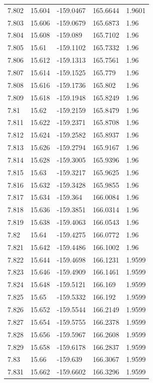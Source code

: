 \begin{tabular}{lllll}
7.802 & 15.604 & -159.0467 & 165.6644 & 1.9601 \\
7.803 & 15.606 & -159.0679 & 165.6873 & 1.96 \\
7.804 & 15.608 & -159.089 & 165.7102 & 1.96 \\
7.805 & 15.61 & -159.1102 & 165.7332 & 1.96 \\
7.806 & 15.612 & -159.1313 & 165.7561 & 1.96 \\
7.807 & 15.614 & -159.1525 & 165.779 & 1.96 \\
7.808 & 15.616 & -159.1736 & 165.802 & 1.96 \\
7.809 & 15.618 & -159.1948 & 165.8249 & 1.96 \\
7.81 & 15.62 & -159.2159 & 165.8479 & 1.96 \\
7.811 & 15.622 & -159.2371 & 165.8708 & 1.96 \\
7.812 & 15.624 & -159.2582 & 165.8937 & 1.96 \\
7.813 & 15.626 & -159.2794 & 165.9167 & 1.96 \\
7.814 & 15.628 & -159.3005 & 165.9396 & 1.96 \\
7.815 & 15.63 & -159.3217 & 165.9625 & 1.96 \\
7.816 & 15.632 & -159.3428 & 165.9855 & 1.96 \\
7.817 & 15.634 & -159.364 & 166.0084 & 1.96 \\
7.818 & 15.636 & -159.3851 & 166.0314 & 1.96 \\
7.819 & 15.638 & -159.4063 & 166.0543 & 1.96 \\
7.82 & 15.64 & -159.4275 & 166.0772 & 1.96 \\
7.821 & 15.642 & -159.4486 & 166.1002 & 1.96 \\
7.822 & 15.644 & -159.4698 & 166.1231 & 1.9599 \\
7.823 & 15.646 & -159.4909 & 166.1461 & 1.9599 \\
7.824 & 15.648 & -159.5121 & 166.169 & 1.9599 \\
7.825 & 15.65 & -159.5332 & 166.192 & 1.9599 \\
7.826 & 15.652 & -159.5544 & 166.2149 & 1.9599 \\
7.827 & 15.654 & -159.5755 & 166.2378 & 1.9599 \\
7.828 & 15.656 & -159.5967 & 166.2608 & 1.9599 \\
7.829 & 15.658 & -159.6178 & 166.2837 & 1.9599 \\
7.83 & 15.66 & -159.639 & 166.3067 & 1.9599 \\
7.831 & 15.662 & -159.6602 & 166.3296 & 1.9599 \\

\end{tabular}
